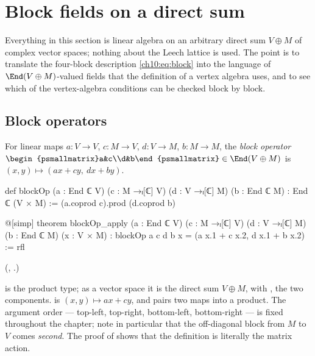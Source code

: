 \section{Block fields on a direct sum}\label{ch10:sec:block}

Everything in this section is linear algebra on an arbitrary direct sum $V\oplus M$ of complex
vector spaces; nothing about the Leech lattice is used.  The point is to translate the
four-block description \eqref{ch10:eq:block} into the language of $\End(V\oplus M)$-valued fields
that the definition of a vertex algebra uses, and to see which of the vertex-algebra conditions
can be checked block by block.

\subsection{Block operators}

\begin{definition}\label{ch10:def:blockop}
For linear maps $a:V\to V$, $c:M\to V$, $d:V\to M$, $b:M\to M$, the \emph{block operator}
$\begin{psmallmatrix}a&c\\d&b\end{psmallmatrix}\in\End(V\oplus M)$ is
$(x,y)\mapsto(ax+cy,\ dx+by)$.
\end{definition}

\begin{leancode}
def blockOp (a : End ℂ V) (c : M →ₗ[ℂ] V) (d : V →ₗ[ℂ] M) (b : End ℂ M) : End ℂ (V × M) :=
  (a.coprod c).prod (d.coprod b)

@[simp] theorem blockOp_apply (a : End ℂ V) (c : M →ₗ[ℂ] V) (d : V →ₗ[ℂ] M) (b : End ℂ M)
    (x : V × M) : blockOp a c d b x = (a x.1 + c x.2, d x.1 + b x.2) := rfl
\end{leancode}
(, .)

\begin{dictionary}
 is the product type; as a vector space it is the direct sum $V\oplus M$, with
,  the two components.   is $(x,y)\mapsto ax+cy$,
and  pairs two maps into a product.  The argument order  --- top-left,
top-right, bottom-left, bottom-right --- is fixed throughout the chapter; note in particular that
the off-diagonal block from $M$ to $V$ comes \emph{second}.  The  proof of
 shows that the definition is literally the matrix action.
\end{dictionary}

